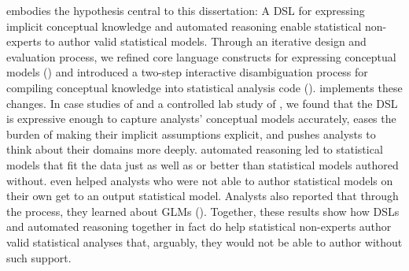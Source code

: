 \tisane embodies the hypothesis central to this dissertation: A DSL for
expressing implicit conceptual knowledge and automated reasoning enable
statistical non-experts to author valid statistical models. Through an iterative
design and evaluation process, we refined core language constructs for
expressing conceptual models (\thesisChallengeExplicit) and introduced a
two-step interactive disambiguation process for compiling conceptual knowledge
into statistical analysis code (\thesisChallengeRep). \rTisane implements these
changes. In case studies of \tisane and a controlled lab study of \rTisane, we
found that the DSL is expressive enough to capture analysts' conceptual models
accurately, eases the burden of making their implicit assumptions explicit, and
pushes analysts to think about their domains more deeply. \rTisanes automated
reasoning led to statistical models that fit the data just as well as or better
than statistical models authored without. \rTisane even helped analysts who were
not able to author statistical models on their own get to an output statistical
model. Analysts also reported that through the process, they learned about GLMs
(\thesisChallengeUnderstanding). Together, these results show how DSLs and
automated reasoning together in fact do help statistical non-experts author
valid statistical analyses that, arguably, they would not be able to author
without such support.  




